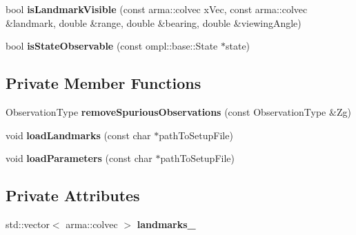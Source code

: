 \begin{DoxyCompactItemize}
\item 
\hypertarget{class_cam_aruco2_d_observation_model_aefa9e3d5d9d40de6ef197d3e25b190bd}{bool {\bfseries is\-Landmark\-Visible} (const arma\-::colvec x\-Vec, const arma\-::colvec \&landmark, double \&range, double \&bearing, double \&viewing\-Angle)}\label{class_cam_aruco2_d_observation_model_aefa9e3d5d9d40de6ef197d3e25b190bd}

\item 
\hypertarget{class_cam_aruco2_d_observation_model_addfed85e3589e4525bb8f2fa03657a01}{bool {\bfseries is\-State\-Observable} (const ompl\-::base\-::\-State $\ast$state)}\label{class_cam_aruco2_d_observation_model_addfed85e3589e4525bb8f2fa03657a01}

\end{DoxyCompactItemize}
\subsection*{\-Private \-Member \-Functions}
\begin{DoxyCompactItemize}
\item 
\hypertarget{class_cam_aruco2_d_observation_model_a616ee9ed0c516b0c9fc0eeb6d492ac3f}{\-Observation\-Type {\bfseries remove\-Spurious\-Observations} (const \-Observation\-Type \&\-Zg)}\label{class_cam_aruco2_d_observation_model_a616ee9ed0c516b0c9fc0eeb6d492ac3f}

\item 
\hypertarget{class_cam_aruco2_d_observation_model_a105506bb8493e23b2a70f4c811577ea3}{void {\bfseries load\-Landmarks} (const char $\ast$path\-To\-Setup\-File)}\label{class_cam_aruco2_d_observation_model_a105506bb8493e23b2a70f4c811577ea3}

\item 
\hypertarget{class_cam_aruco2_d_observation_model_af2586c7b2c3ab276f1c13ba1e3ba71f3}{void {\bfseries load\-Parameters} (const char $\ast$path\-To\-Setup\-File)}\label{class_cam_aruco2_d_observation_model_af2586c7b2c3ab276f1c13ba1e3ba71f3}

\end{DoxyCompactItemize}
\subsection*{\-Private \-Attributes}
\begin{DoxyCompactItemize}
\item 
\hypertarget{class_cam_aruco2_d_observation_model_a06626a8304e171f284bd550d02b6f63c}{std\-::vector$<$ arma\-::colvec $>$ {\bfseries landmarks\-\_\-}}\label{class_cam_aruco2_d_observation_model_a06626a8304e171f284bd550d02b6f63c}

\end{DoxyCompactItemize}
